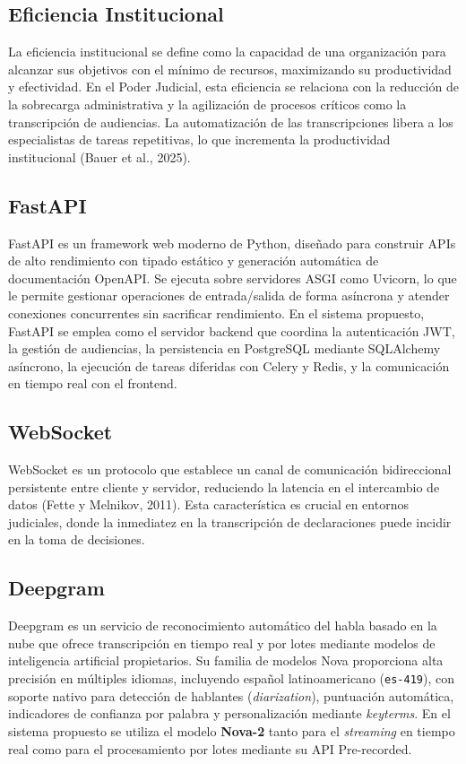 \documentclass[12pt,a4paper,oneside]{report}
\begin{document}
\subsection{Eficiencia Institucional}

La eficiencia institucional se define como la capacidad de una organización para alcanzar sus objetivos con el mínimo de recursos, maximizando su productividad y efectividad. En el Poder Judicial, esta eficiencia se relaciona con la reducción de la sobrecarga administrativa y la agilización de procesos críticos como la transcripción de audiencias. La automatización de las transcripciones libera a los especialistas de tareas repetitivas, lo que incrementa la productividad institucional (Bauer et al., 2025).

\subsection{FastAPI}

FastAPI es un framework web moderno de Python, diseñado para construir APIs de alto rendimiento con tipado estático y generación automática de documentación OpenAPI. Se ejecuta sobre servidores ASGI como Uvicorn, lo que le permite gestionar operaciones de entrada/salida de forma asíncrona y atender conexiones concurrentes sin sacrificar rendimiento. En el sistema propuesto, FastAPI se emplea como el servidor backend que coordina la autenticación JWT, la gestión de audiencias, la persistencia en PostgreSQL mediante SQLAlchemy asíncrono, la ejecución de tareas diferidas con Celery y Redis, y la comunicación en tiempo real con el frontend.

\subsection{WebSocket}

WebSocket es un protocolo que establece un canal de comunicación bidireccional persistente entre cliente y servidor, reduciendo la latencia en el intercambio de datos (Fette y Melnikov, 2011). Esta característica es crucial en entornos judiciales, donde la inmediatez en la transcripción de declaraciones puede incidir en la toma de decisiones.

\subsection{Deepgram}

Deepgram es un servicio de reconocimiento automático del habla basado en la nube que ofrece transcripción en tiempo real y por lotes mediante modelos de inteligencia artificial propietarios. Su familia de modelos Nova proporciona alta precisión en múltiples idiomas, incluyendo español latinoamericano (\texttt{es-419}), con soporte nativo para detección de hablantes (\textit{diarization}), puntuación automática, indicadores de confianza por palabra y personalización mediante \textit{keyterms}. En el sistema propuesto se utiliza el modelo \textbf{Nova-2} tanto para el \textit{streaming} en tiempo real como para el procesamiento por lotes mediante su API Pre-recorded.
\end{document}
